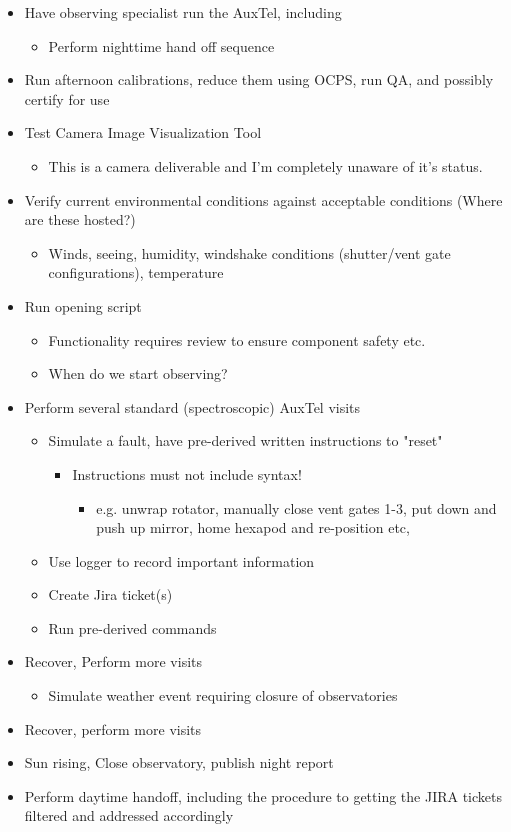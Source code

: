 \begin{itemize}
\item Have observing specialist run the AuxTel, including
  \begin{itemize}
  \item Perform nighttime hand off sequence
  \end{itemize}
\item Run afternoon calibrations, reduce them using \gls{OCPS}, run QA, and possibly certify for use
\item Test Camera Image Visualization Tool
  \begin{itemize}
  \item This is a camera deliverable and I'm completely unaware of it's status.
  \end{itemize}
\item Verify current environmental conditions against acceptable conditions (Where are these hosted?)
  \begin{itemize}
  \item Winds, seeing, humidity, windshake conditions (shutter/vent gate configurations), temperature
  \end{itemize}
\item Run opening script
  \begin{itemize}
  \item Functionality requires review to ensure component safety etc.
  \item When do we start observing?
  \end{itemize}
\item Perform several standard (spectroscopic) AuxTel visits
  \begin{itemize}
  \item Simulate a fault, have pre-derived written instructions to "reset" 
    \begin{itemize}
    \item Instructions must not include syntax!
      \begin{itemize}
      \item e.g. unwrap rotator, manually close vent gates 1-3, put down and push up mirror, home hexapod and re-position etc,
      \end{itemize}
    \end{itemize}
  \item Use logger to record important information
  \item Create Jira ticket(s)
  \item Run pre-derived commands
  \end{itemize}
\item Recover, Perform more visits
  \begin{itemize}
  \item Simulate weather event requiring closure of observatories
  \end{itemize}
\item Recover, perform more visits
\item Sun rising, Close observatory, publish night report
\item Perform daytime handoff, including the procedure to getting the JIRA tickets filtered and addressed accordingly
\end{itemize}

